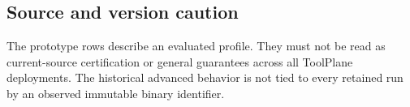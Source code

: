 \subsection*{Source and version caution}
The prototype rows describe an evaluated profile. They must not be read as current-source certification or general guarantees across all ToolPlane deployments. The historical advanced behavior is not tied to every retained run by an observed immutable binary identifier.

